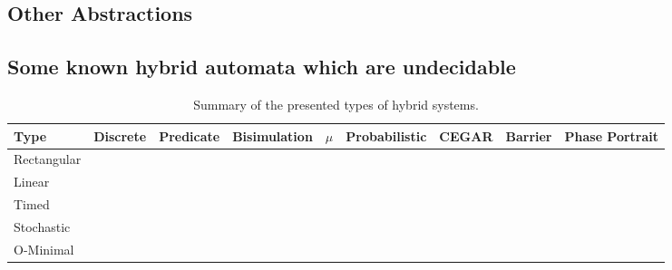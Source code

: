 \subsection{Other Abstractions}
\label{sec:misc}



\subsection{Some known hybrid automata which are undecidable}
\label{sec:undec}



\begin{table}
\begin{center}
\begin{tabular}{|l|l|l|l|l|l|l|l|l|}\hline
Type & Discrete & Predicate & Bisimulation & $\mu$ & Probabilistic & CEGAR & Barrier & Phase Portrait \\ \hline
Rectangular &  &  &  &  &  &  &  & \\ \hline
Linear &  &  &  &  &  &  &  & \\ \hline
Timed &  &  &  &  &  &  &  & \\ \hline
Stochastic &  &  &  &  &  &  &  & \\ \hline
O-Minimal &  &  &  &  &  &  &  & \\ \hline
\end{tabular}
\label{tab:abssummary}
\caption{Summary of the presented types of hybrid systems.}
\end{center}
\end{table}
